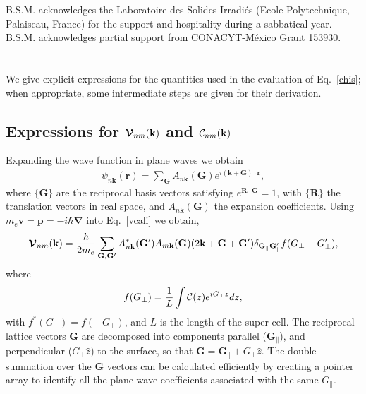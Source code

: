 \documentclass[floatfix,prb,aps,superscriptaddress,showpacs,11pt,preprint,letterpaper]{revtex4}
\begin{document}
B.S.M. acknowledges the Laboratoire des Solides Irradi\'es (Ecole
Polytechnique, Palaiseau, France) for the support and hospitality
during a sabbatical year. B.S.M. acknowledges partial support from
CONACYT-M\'exico Grant 153930. 

\appendix 
\section{}\label{appe}
We give explicit expressions for the quantities used in the evaluation 
of Eq.~\eqref{chis}; when appropriate, some 
intermediate steps are given for their derivation. 
\subsection{ Expressions for 
\texorpdfstring{${\boldsymbol{\mathcal{\cal V}}}_{nm}(\mathbf{k})$}{que} 
and 
\texorpdfstring{${\cal C}_{nm}(\mathbf{k})$}{que}
}\label{calpcalc}

Expanding the wave function in plane waves we obtain
\begin{align}\label{eni.1}
\psi_{n\mathbf{k}}(\mathbf{r})=\sum_\mathbf{G} A_{n\mathbf{k}}(\mathbf{G})e^{i(\mathbf{k}+\mathbf{G})\cdot\mathbf{r}}
,
\end{align}
where $\{\mathbf{G}\}$ are the reciprocal basis vectors satisfying
$e^{\mathbf{R}\cdot\mathbf{G}}=1$, with $\{\mathbf{R}\}$ the translation vectors in real
space, and $A_{n\mathbf{k}}(\mathbf{G})$ the expansion coefficients. Using
$m_e\mathbf{v}=\mathbf{p}=-i\hbar\boldsymbol{\nabla}$ into 
Eq.~\eqref{vcali}
we obtain,\cite{mendozaPRB06}
\begin{align}\label{eni.2}
\boldsymbol{\mathcal{\cal V}}_{nm}(\mathbf{k})=
\frac{\hbar}{2m_e}
\sum_{\mathbf{G},\mathbf{G}'} A^*_{n\mathbf{k}}(\mathbf{G}')  A_{m\mathbf{k}}(\mathbf{G})
(2\mathbf{k}+\mathbf{G}+\mathbf{G}')
\delta_{\mathbf{G}_\parallel \mathbf{G}'_\parallel}  
f(G_\perp-G'_\perp)
,
\end{align}   
where
\begin{align}\label{vnl.9}
f(G_\perp)=\frac{1}{L}\int{\mathbf{\cal C}}(z) e^{iG_\perp z}dz  
 ,
\end{align}
with $f^*(G_\perp)=f(-G_\perp)$,
and $L$
is the length of the super-cell. 
The reciprocal lattice vectors $\mathbf{G}$ are 
decomposed into components
parallel ($\mathbf{G}_\parallel$), and perpendicular ($G_\perp \hat z$)
to the surface, so
that $\mathbf{G} = \mathbf{G}_\parallel + G_\perp\hat z$.
The double summation over the $\mathbf{G}$ vectors can be 
calculated efficiently by  
creating a pointer array to identify all the plane-wave coefficients  
associated with the same $G_\parallel$.  
\end{document}
